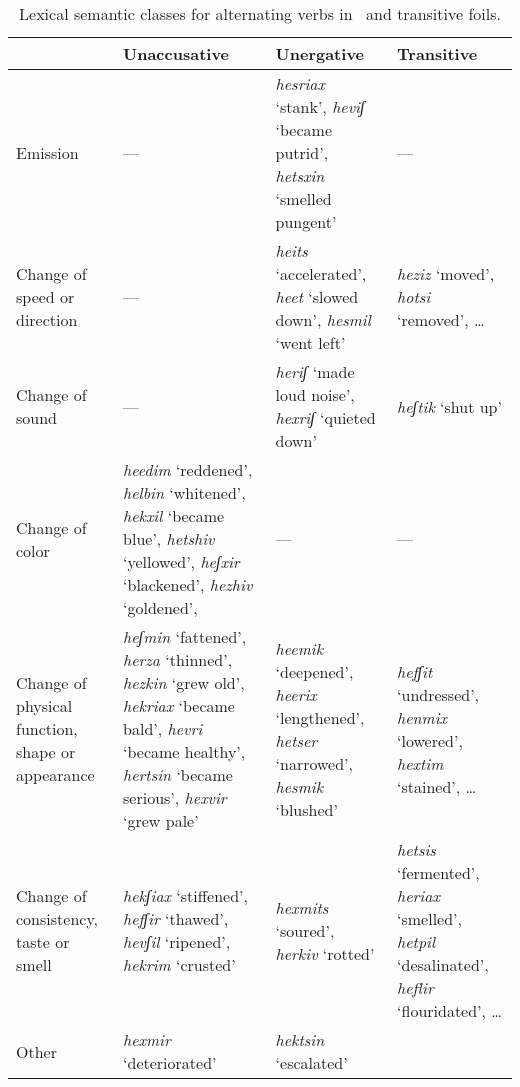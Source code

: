 \begin{table}[htb] \small \centering \singlespacing
	\begin{tabular}{|p{3cm}||p{4.5cm}|p{4.5cm}||p{3cm}|}\hline
		&	\textbf{Unaccusative}	&  \textbf{Unergative} & \textbf{Transitive} \\\hline\hline
	Emission & --- & \emph{hesriax} `stank', \emph{heviʃ} `became putrid', \emph{hetsxin} `smelled pungent'\footnotemark & --- \\\hline
	
	Change of speed or direction & --- & \emph{heits} `accelerated', \emph{heet} `slowed down', \emph{hesmil} `went left' & \emph{heziz} `moved', \emph{hotsi} `removed', \dots \\\hline
	
	Change of sound & --- & \emph{heriʃ} `made loud noise', \emph{hexriʃ} `quieted down' & \emph{heʃtik} `shut up' \\\hline\hline
	
	Change of color & \emph{heedim} `reddened', \emph{helbin} `whitened', \emph{hekxil} `became blue', \emph{he{ts}hiv} `yellowed', \emph{heʃxir} `blackened', \emph{hezhiv} `goldened', 
				& --- & --- \\\hline\hline
		
	Change of physical function, shape or appearance & \emph{heʃmin} `fattened', \emph{herza} `thinned', \emph{hezkin} `grew old', \emph{hekriax} `became bald', \emph{hevri} `became healthy', \emph{her{ts}in} `became serious', \emph{hexvir} `grew pale' &
		\emph{heemik} `deepened', \emph{heerix} `lengthened', \emph{he{ts}er} `narrowed', \emph{hesmik} `blushed' & \emph{hefʃit} `undressed', \emph{henmix} `lowered', \emph{hextim} `stained', \dots \\\hline

	Change of consistency, taste or smell & \emph{hekʃiax} `stiffened', \emph{hefʃir} `thawed', \emph{hevʃil} `ripened', \emph{hekrim} `crusted'
		& \emph{hexmits} `soured', \emph{herkiv} `rotted'
		& \emph{hetsis} `fermented', \emph{heriax} `smelled', \emph{hetpil} `desalinated', \emph{heflir} `flouridated', \dots \\\hline\hline
		
	Other & \emph{hexmir} `deteriorated' & \emph{hek{ts}in} `escalated' &  \\\hline
	\end{tabular}
\caption{Lexical semantic classes for alternating verbs in \thif~and transitive foils.\label{tab:vd:thif-roots}}
\end{table}

